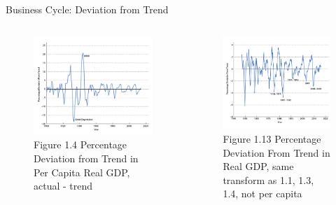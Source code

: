 \documentclass[11pt,aspectratio=169,usenames,dvipsnames]{beamer}
\begin{document}
\begin{frame}{Business Cycle: Deviation from Trend}
\label{slide:Business_Cycle__Deviation_from_Trend}
    \begin{columns}
        \begin{column}{0.5\textwidth}
            \begin{figure}
                \caption{Figure 1.4 Percentage Deviation from Trend in Per Capita Real GDP, \alert{actual - trend}}
                \includegraphics[width=\textwidth]{./figures/Figure1_4.jpg}
            \end{figure}
        \end{column}
        \begin{column}{0.5\textwidth}
            \begin{figure}
                \caption{Figure 1.13 Percentage Deviation From Trend in Real GDP, \alert{same transform as 1.1, 1.3, 1.4, not per capita} }
                \includegraphics[width=\textwidth]{./figures/Figure1_13.jpg}
            \end{figure}
        \end{column}
    \end{columns}
\end{frame}
\end{document}
